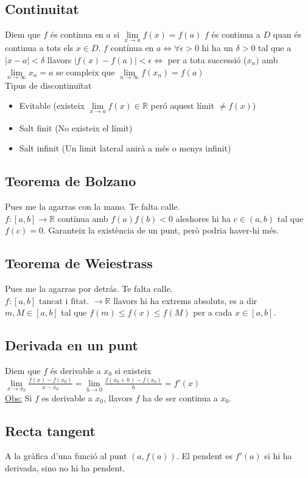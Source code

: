 \subsection{Continuitat}
Diem que $f$ és continua en $a$ si $\lim\limits_{x\rightarrow a} f(x) = f(a)$ $f$ és continua a $D$ quan és continua a tots els $x \in D$. $f$ contínua en $a \Longleftrightarrow \forall \epsilon > 0$ hi ha un $\delta > 0$ tal que a $|x-a| < \delta$ llavors $|f(x) - f(a)| < \epsilon \Longleftrightarrow$ per a tota successió ($x_n)$ amb $\lim\limits_{n\rightarrow \infty} x_n = a$ se compleix que $\lim\limits_{n\rightarrow \infty} f(x_n) = f(a)$\\
Tipus de discontinuïtat
\begin{itemize}
    \item Evitable (existeix $\lim\limits_{x\rightarrow a} f(x) \in \mathbb{R}$ peró aquest límit $\neq f(x)$)
    \item Salt finit (No existeix el límit) 
    \item Salt infinit (Un limit lateral anirà a més o menys infinit)
\end{itemize}
\subsection{Teorema de Bolzano}
Pues me la agarras con la mano. Te falta calle.\\
$f: [a, b] \rightarrow \mathbb{R}$ contínua amb $f(a)f(b)<0$ aleshores hi ha $c\in (a,b)$ tal que $f(c) = 0$. Garanteix la existència de un punt, però podria haver-hi més.
\subsection{Teorema de Weiestrass}
Pues me la agarras por detrás. Te falta calle.\\
$f: [a, b] \text{ tancat i fitat. } \rightarrow \mathbb{R}$ llavors hi ha extrems absoluts, es a dir $m, M \in [a, b]$ tal que $f(m) \leq f(x) \leq f(M)$ per a cada $x \in [a, b]$.
\subsection{Derivada en un punt}
Diem que $f$ és derivable a $x_0$ si existeix $\lim\limits_{x\rightarrow x_0} \frac{f(x)-f(x_0)}{x-x_0} = \lim\limits_{h\rightarrow 0} \frac{f(x_0+h)-f(x_0)}{h} = f'(x)$\\
\underline{Obs:} Si $f$ es derivable a $x_0$, llavors $f$ ha de ser continua a $x_0$.
\subsection{Recta tangent}
A la gràfica d'una funció al punt $(a, f(a))$. El pendent es $f'(a)$ si hi ha derivada, sino no hi ha pendent.
